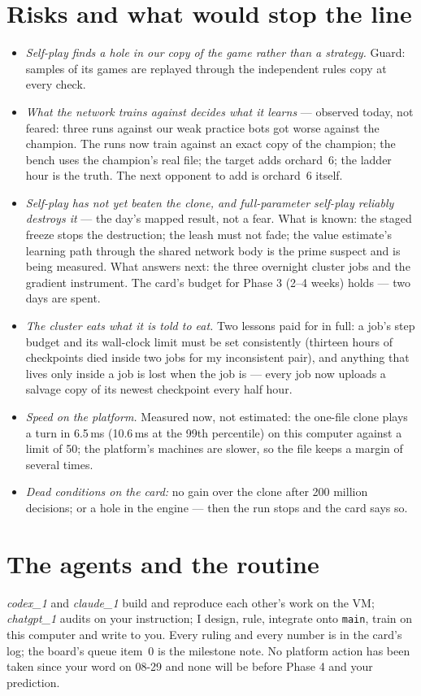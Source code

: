 \documentclass[11pt,a4paper]{article}
\begin{document}
\section{Risks and what would stop the line}

\begin{itemize}[nosep,leftmargin=1.4em]
  \item \emph{Self-play finds a hole in our copy of the game rather than a strategy.} Guard: samples of its games are replayed through the independent rules copy at every check.
  \item \emph{What the network trains against decides what it learns} --- observed today, not feared: three runs against our weak practice bots got worse against the champion. The runs now train against an exact copy of the champion; the bench uses the champion's real file; the target adds orchard~6; the ladder hour is the truth. The next opponent to add is orchard~6 itself.
  \item \emph{Self-play has not yet beaten the clone, and full-parameter self-play reliably destroys it} --- the day's mapped result, not a fear. What is known: the staged freeze stops the destruction; the leash must not fade; the value estimate's learning path through the shared network body is the prime suspect and is being measured. What answers next: the three overnight cluster jobs and the gradient instrument. The card's budget for Phase 3 (2--4 weeks) holds --- two days are spent.
  \item \emph{The cluster eats what it is told to eat.} Two lessons paid for in full: a job's step budget and its wall-clock limit must be set consistently (thirteen hours of checkpoints died inside two jobs for my inconsistent pair), and anything that lives only inside a job is lost when the job is --- every job now uploads a salvage copy of its newest checkpoint every half hour.
  \item \emph{Speed on the platform.} Measured now, not estimated: the one-file clone plays a turn in 6.5\,ms (10.6\,ms at the 99th percentile) on this computer against a limit of 50; the platform's machines are slower, so the file keeps a margin of several times.
  \item \emph{Dead conditions on the card:} no gain over the clone after 200 million decisions; or a hole in the engine --- then the run stops and the card says so.
\end{itemize}

\section*{The agents and the routine}
\emph{codex\_1} and \emph{claude\_1} build and reproduce each other's work on the VM; \emph{chatgpt\_1} audits on your instruction; I design, rule, integrate onto \texttt{main}, train on this computer and write to you. Every ruling and every number is in the card's log; the board's queue item~0 is the milestone note. No platform action has been taken since your word on 08-29 and none will be before Phase 4 and your prediction.
\end{document}
